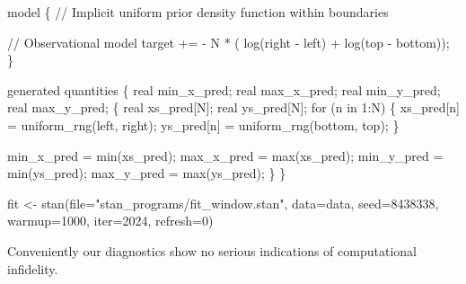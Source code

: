 \documentclass[
  letterpaper,
  DIV=11,
  numbers=noendperiod]{scrartcl}
\newenvironment{Shaded}{\begin{snugshade}}{\end{snugshade}}
\newcommand{\AttributeTok}[1]{\textcolor[rgb]{0.40,0.45,0.13}{#1}}
\newcommand{\CommentTok}[1]{\textcolor[rgb]{0.37,0.37,0.37}{#1}}
\newcommand{\ControlFlowTok}[1]{\textcolor[rgb]{0.00,0.23,0.31}{#1}}
\newcommand{\DataTypeTok}[1]{\textcolor[rgb]{0.68,0.00,0.00}{#1}}
\newcommand{\DecValTok}[1]{\textcolor[rgb]{0.68,0.00,0.00}{#1}}
\newcommand{\FunctionTok}[1]{\textcolor[rgb]{0.28,0.35,0.67}{#1}}
\newcommand{\KeywordTok}[1]{\textcolor[rgb]{0.00,0.23,0.31}{#1}}
\newcommand{\NormalTok}[1]{\textcolor[rgb]{0.00,0.23,0.31}{#1}}
\newcommand{\OtherTok}[1]{\textcolor[rgb]{0.00,0.23,0.31}{#1}}
\newcommand{\SpecialCharTok}[1]{\textcolor[rgb]{0.37,0.37,0.37}{#1}}
\newcommand{\StringTok}[1]{\textcolor[rgb]{0.13,0.47,0.30}{#1}}
\begin{document}
\begin{codelisting}
\begin{Shaded}
\begin{Highlighting}[]
\KeywordTok{model}\NormalTok{ \{}
  \CommentTok{// Implicit uniform prior density function within boundaries}
  
  \CommentTok{// Observational model}
  \KeywordTok{target +=}\NormalTok{ {-} N * ( log(right {-} left) + log(top {-} bottom));}
\NormalTok{\}}

\KeywordTok{generated quantities}\NormalTok{ \{}
  \DataTypeTok{real}\NormalTok{ min\_x\_pred;}
  \DataTypeTok{real}\NormalTok{ max\_x\_pred;}
  \DataTypeTok{real}\NormalTok{ min\_y\_pred;}
  \DataTypeTok{real}\NormalTok{ max\_y\_pred;}
\NormalTok{  \{}
    \DataTypeTok{real}\NormalTok{ xs\_pred[N];}
    \DataTypeTok{real}\NormalTok{ ys\_pred[N];}
    \ControlFlowTok{for}\NormalTok{ (n }\ControlFlowTok{in} \DecValTok{1}\NormalTok{:N) \{}
\NormalTok{      xs\_pred[n] = uniform\_rng(left, right);}
\NormalTok{      ys\_pred[n] = uniform\_rng(bottom, top);}
\NormalTok{    \}}

\NormalTok{    min\_x\_pred = min(xs\_pred);}
\NormalTok{    max\_x\_pred = max(xs\_pred);}
\NormalTok{    min\_y\_pred = min(ys\_pred);}
\NormalTok{    max\_y\_pred = max(ys\_pred);}
\NormalTok{  \}}
\NormalTok{\}}
\end{Highlighting}
\end{Shaded}

\end{codelisting}

\begin{Shaded}
\begin{Highlighting}[]
\NormalTok{fit }\OtherTok{\textless{}{-}} \FunctionTok{stan}\NormalTok{(}\AttributeTok{file=}\StringTok{"stan\_programs/fit\_window.stan"}\NormalTok{,}
            \AttributeTok{data=}\NormalTok{data, }\AttributeTok{seed=}\DecValTok{8438338}\NormalTok{,}
            \AttributeTok{warmup=}\DecValTok{1000}\NormalTok{, }\AttributeTok{iter=}\DecValTok{2024}\NormalTok{, }\AttributeTok{refresh=}\DecValTok{0}\NormalTok{)}
\end{Highlighting}
\end{Shaded}

Conveniently our diagnostics show no serious indications of
computational infidelity.

\begin{Shaded}
\end{Shaded}
\end{document}
